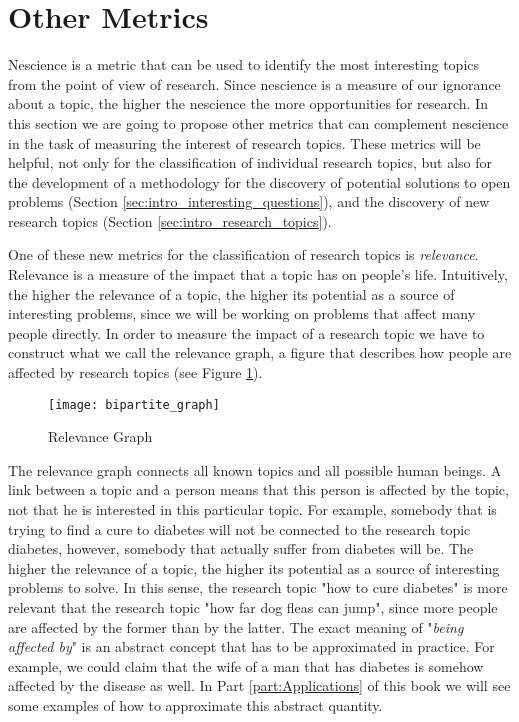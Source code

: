 %
%

\section{Other Metrics}

Nescience is a metric that can be used to identify the most interesting topics from the point of view of research. Since nescience is a measure of our ignorance about a topic, the higher the nescience the more opportunities for research. In this section we are going to propose other metrics that can complement nescience in the task of measuring the interest of research topics. These metrics will be helpful, not only for the classification of individual research topics, but also for the development of a methodology for the discovery of potential solutions to open problems (Section \ref{sec:intro_interesting_questions}), and the discovery of new research topics (Section \ref{sec:intro_research_topics}).

One of these new metrics for the classification of research topics is \emph{relevance}. Relevance is a measure of the impact that a topic has on people's life. Intuitively, the higher the relevance of a topic, the higher its potential as a source of interesting problems, since we will be working on problems that affect many people directly. In order to measure the impact of a research topic we have to construct what we call the relevance graph, a figure that describes how people are affected by research topics (see Figure \ref{fig:Relevance-Graph_Intro}).

\begin{figure}[h]
\centering\texttt{[image: bipartite\_graph]}
\caption{\label{fig:Relevance-Graph_Intro}Relevance Graph}
\end{figure}

The relevance graph connects all known topics and all possible human beings. A link between a topic and a person means that this person is affected by the topic, not that he is interested in this particular topic. For example, somebody that is trying to find a cure to diabetes will not be connected to the research topic diabetes, however, somebody that actually suffer from diabetes will be. The higher the relevance of a topic, the higher its potential as a source of interesting problems to solve. In this sense, the research topic "how to cure diabetes" is more relevant that the research topic "how far dog fleas can jump", since more people are affected by the former than by the latter. The exact meaning of "\emph{being affected by}" is an abstract concept that has to be approximated in practice. For example, we could claim that the wife of a man that has diabetes is somehow affected by the disease as well. In Part \ref{part:Applications} of this book we will see some examples of how to approximate this abstract quantity.

